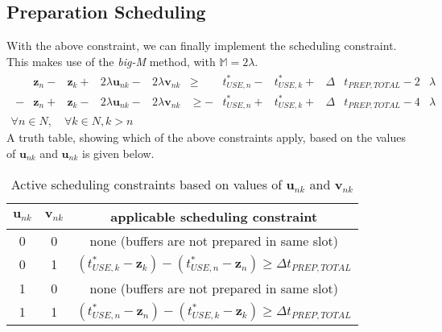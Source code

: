 \subsection{Preparation Scheduling}\label{SS.constr9}
With the above constraint, we can finally implement the scheduling constraint.
This makes use of the \emph{big-M} method, with $\mathbb{M} = 2 \lambda$.
\begin{equation}
    \begin{split}
        \begin{alignedat}{10}
            &\boldsymbol{z}_{n} {}-{} &\boldsymbol{z}_{k} {}+{} &2 \lambda
            \boldsymbol{u}_{nk} {}-{} &2 \lambda \boldsymbol{v}_{nk} &\ge
            &t_{\mathit{USE},n}^{*} {}-{} &t_{USE,k}^{*} {}+{}
            &\Delta &t_{\mathit{PREP,TOTAL}} {}-{} 2 &\lambda\\
            - &\boldsymbol{z}_{n} {}+{} &\boldsymbol{z}_{k} {}-{} &2 \lambda
            \boldsymbol{u}_{nk} {}-{} &2 \lambda \boldsymbol{v}_{nk} &\ge
            - &t_{\mathit{USE},n}^{*} {}+{} &t_{\mathit{USE},k}^{*} {}+{}
            &\Delta &t_{\mathit{PREP,TOTAL}} {}-{} 4 &\lambda
        \end{alignedat}
        \\\forall n \in N, \quad \forall k \in N, k > n
    \end{split}
    \label{eq.constr9}
\end{equation}
A truth table, showing which of the above constraints apply, based on the
values of $\boldsymbol{u}_{nk}$ and $\boldsymbol{u}_{nk}$ is given below.
\begin{table}[h!]
    \centering
    \caption{Active scheduling constraints based on values of 
             $\boldsymbol{u}_{nk}$ and $\boldsymbol{v}_{nk}$}
    \label{tbl.truthw}
    \begin{tabular}{c c | c}
        $\boldsymbol{u}_{nk}$ & $\boldsymbol{v}_{nk}$
        & applicable scheduling constraint\\ \hline
        0 & 0 & none (buffers are not prepared in same slot)\\
        0 & 1 & $\left( t_{\mathit{USE},k}^{*} - \boldsymbol{z}_{k} \right)
            - \left( t_{\mathit{USE},n}^{*} - \boldsymbol{z}_{n} \right)
            \ge \Delta t_{\mathit{PREP,TOTAL}}$\\
        1 & 0 & none (buffers are not prepared in same slot)  \\
        1 & 1 & $\left( t_{\mathit{USE},n}^{*} - \boldsymbol{z}_{n} \right)
            - \left( t_{\mathit{USE},k}^{*} - \boldsymbol{z}_{k} \right)
            \ge \Delta t_{\mathit{PREP,TOTAL}}$\\
    \end{tabular}
\end{table}

